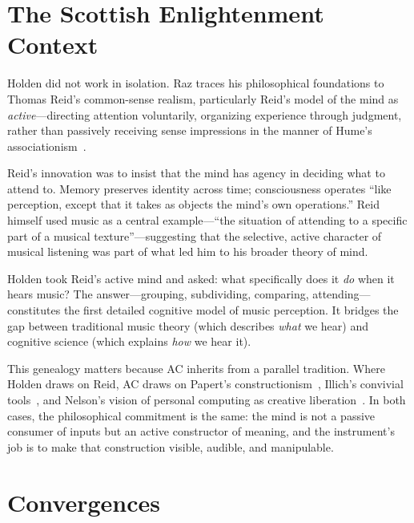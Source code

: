 \documentclass[10pt,letterpaper,twocolumn]{article}
\begin{document}
\section{The Scottish Enlightenment Context}
\label{sec:context}

Holden did not work in isolation. Raz traces his philosophical foundations to Thomas Reid's common-sense realism, particularly Reid's model of the mind as \emph{active}---directing attention voluntarily, organizing experience through judgment, rather than passively receiving sense impressions in the manner of Hume's associationism~\citep{reid1764, hume1739}.

Reid's innovation was to insist that the mind has agency in deciding what to attend to. Memory preserves identity across time; consciousness operates ``like perception, except that it takes as objects the mind's own operations.'' Reid himself used music as a central example---``the situation of attending to a specific part of a musical texture''---suggesting that the selective, active character of musical listening was part of what led him to his broader theory of mind.

Holden took Reid's active mind and asked: what specifically does it \emph{do} when it hears music? The answer---grouping, subdividing, comparing, attending---constitutes the first detailed cognitive model of music perception. It bridges the gap between traditional music theory (which describes \emph{what} we hear) and cognitive science (which explains \emph{how} we hear it).

This genealogy matters because AC inherits from a parallel tradition. Where Holden draws on Reid, AC draws on Papert's constructionism~\citep{papert1980}, Illich's convivial tools~\citep{illich1973}, and Nelson's vision of personal computing as creative liberation~\citep{nelson1974}. In both cases, the philosophical commitment is the same: the mind is not a passive consumer of inputs but an active constructor of meaning, and the instrument's job is to make that construction visible, audible, and manipulable.

\section{Convergences}
\label{sec:convergences}
\end{document}
